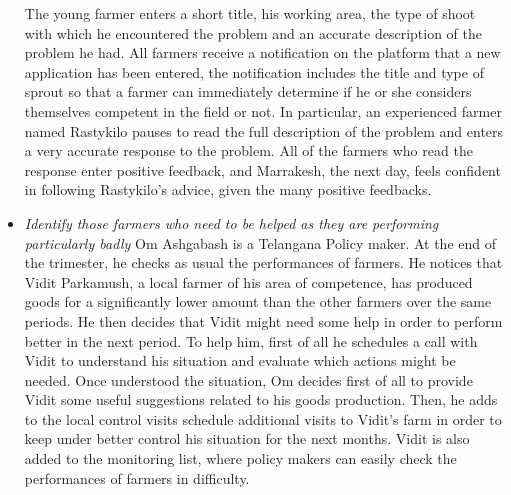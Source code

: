 \documentclass[10pt]{article}
\begin{document}
\begin{itemize}
      The young farmer enters a short title, his working area, the type of shoot with which he encountered the problem and an accurate description 
      of the problem he had. All farmers receive a notification on the platform that a new application has been entered, the notification includes 
      the title and type of sprout so that a farmer can immediately determine if he or she considers themselves competent in the field or not. 
      In particular, an experienced farmer named Rastykilo pauses to read the full description of the problem and enters a very accurate 
      response to the problem. All of the farmers who read the response enter positive feedback, and Marrakesh, the next day, feels confident 
      in following Rastykilo's advice, given the many positive feedbacks.
      \item \textit{Identify those farmers who need to be helped as they are performing particularly badly}
      Om Ashgabash is a Telangana Policy maker. At the end of the trimester, he checks as usual the performances of farmers. He notices that Vidit Parkamush, a local
      farmer of his area of competence, has produced goods for a significantly lower amount than the other farmers over the same periods. He then decides that Vidit might
      need some help in order to perform better in the next period. To help him, first of all he schedules a call with Vidit to understand his situation and evaluate which
      actions might be needed. Once understood the situation, Om decides first of all to provide Vidit some useful suggestions related to his goods production. Then, he adds
      to the local control visits schedule additional visits to Vidit's farm in order to keep under better control his situation for the next months. Vidit is also added to the
      monitoring list, where policy makers can easily check the performances of farmers in difficulty.
\end{itemize}
\end{document}
